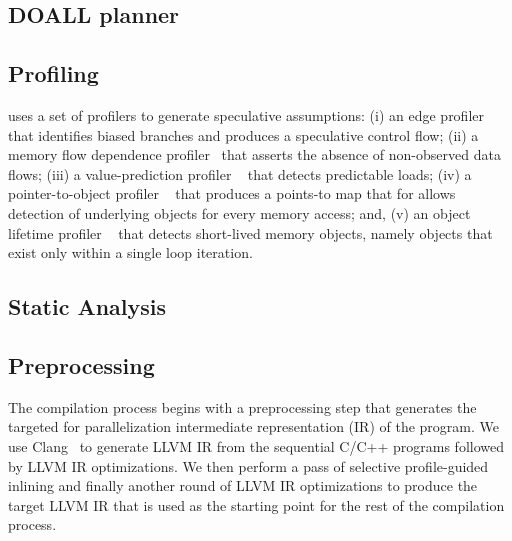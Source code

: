 %

\subsection{DOALL planner}
\label{planner}


\subsection{Profiling}

\name uses a set of profilers to generate speculative assumptions:
%
(i) an edge profiler~\cite{LLVM:CGO04} that identifies biased
branches and produces a speculative control flow;
%
(ii) a memory flow dependence profiler~\cite{chen:04:cc} that asserts
the absence of non-observed data flows;
%
(iii) a value-prediction profiler ~\cite{gabbay:97:micro} that detects predictable loads;
%
(iv) a pointer-to-object profiler ~\cite{johnson:12:pldi}
that produces a points-to map that for allows detection of underlying objects
for every memory access; and,
%
(v) an object lifetime profiler ~\cite{johnson:12:pldi}
that detects short-lived memory objects, namely objects that exist only within a
single loop iteration.
%

\subsection {Static Analysis}


% 


\subsection{Preprocessing}

The compilation process begins with a preprocessing step that
generates the targeted for parallelization intermediate representation
(IR) of the program. We use Clang~\cite{LLVM:CGO04} to generate LLVM IR
from the sequential C/C++ programs followed by LLVM IR optimizations.
We then perform a pass of selective profile-guided
inlining and finally another round of LLVM IR optimizations to produce
the target LLVM IR that is used as the starting point for the rest of
the compilation process.

